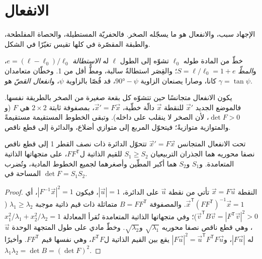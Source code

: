 \section{الانفعال}\label{sec:b1:stress-strain-rheology:strain}

الإجهاد سبب، والانفعال هو ما يسجّله الصخر. فالحفريّة المستطيلة، والحصاة المفلطحة، والطبقة المقصّرة في  كلها تقيس تغيّرًا في الشكل.

\begin{definition}\label{def:b1:stress-strain-rheology:strain}
خطّ من المادة طوله $\ell_0$ تشوّه إلى الطول $\ell$ له \emph{الاستطالة} $e = (\ell - \ell_0)/\ell_0$، و\emph{المطّ} $S = \ell/\ell_0 = 1 + e$؛ والقِصَر استطالةٌ سالبة، ومطٌّ أقل من 1. وخطّان متعامدان كانا، وصارا يصنعان الزاوية $\ang{90} - \psi$، قد قُصّا بالزاوية $\psi$، و\emph{انفعال القصّ} هو $\gamma = \tan\psi$.
\end{definition}

يكون الانفعال متجانسًا حين تتشوّه كل بقعة صغيرة من الصخر بالطريقة نفسها. فالموضع الجديد $\vec x'$ للنقطة $\vec x$ دالّة خطّية، $\vec x' = F\vec x$، بمصفوفة ثابتة $2\times2$ هي $F$ (و$\det F > 0$، لأن الصخر لا ينقلب على داخله). وتبقى الخطوط المستقيمة مستقيمةً والمتوازية متوازيةً؛ فيتحوّل المربع إلى متوازي أضلاع، والدائرة إلى قطع ناقص.

\begin{proposition}\label{prop:b1:stress-strain-rheology:ellipse}
تحت الانفعال المتجانس $\vec x' = F\vec x$ تتحوّل الدائرة ذات نصف القطر 1 إلى قطع ناقص نصفا محوريه هما الجذران التربيعيان $S_1 \ge S_2$ للقيم الذاتية ل$FF^{\mathsf T}$، على متجهاتها الذاتية المتعامدة. و$S_1$ و$S_2$ هما أكبر المطّين وأصغرهما لجميع الخطوط المادية، وتُضرب المساحة في $\det F = S_1S_2$.
\end{proposition}

\begin{proof}
النقطة $\vec x = F\vec u$ تأتي من نقطة $\vec u$ على الدائرة، $|\vec u| = 1$، فيكون $|F^{-1}\vec x|^2 = 1$، أي $\vec x^{\mathsf T}(FF^{\mathsf T})^{-1}\vec x = 1$. والمصفوفة $B = FF^{\mathsf T}$ متماثلة ذات قيم ذاتية موجبة $\lambda_1 \ge
\lambda_2$ ($\vec v^{\mathsf T}B\vec v = |F^{\mathsf T}\vec v|^2 > 0$)؛ وفي متجهاتها الذاتية المتعامدة تُقرأ المعادلة $x_1^2/\lambda_1 + x_2^2/\lambda_2 = 1$، وهي قطع ناقص نصفا محوريه $\sqrt{\lambda_1}$ و$\sqrt{\lambda_2}$. وخطّ مادي على طول المتجهة الوحدة $\vec u$ له  $|F\vec u|$، و$|F\vec u|^2 = \vec u^{\mathsf T}F^{\mathsf T}F\vec u$ يقع بين القيم الذاتية ل$F^{\mathsf T}F$، وهي نفسها قيم $FF^{\mathsf T}$. وأخيرًا $\lambda_1\lambda_2 = \det B = (\det F)^2$.
\end{proof}

